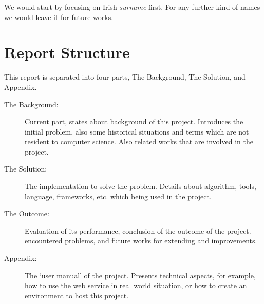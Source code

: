 We would start by focusing on Irish \textit{surname} first.
For any further kind of names we would leave it for future works.

\section{Report Structure}

This report is separated into four parts, The Background, The Solution,
and Appendix.

\begin{description}
\item[The Background:]
  Current part, states about background of this project. Introduces
  the initial problem, also some historical situations and terms
  which are not resident to computer science. Also related works
  that are involved in the project.
\item[The Solution:]
  The implementation to solve the problem. Details about algorithm,
  tools, language, frameworks, etc. which being used in the project.
\item[The Outcome:]
  Evaluation of its performance, conclusion of the outcome of the project.
  encountered problems, and future works for extending and improvements.
\item[Appendix:]
  The `user manual' of the project. Presents technical aspects,
  for example, how to use the web service in real world situation,
  or how to create an environment to host this project.
\end{description}
